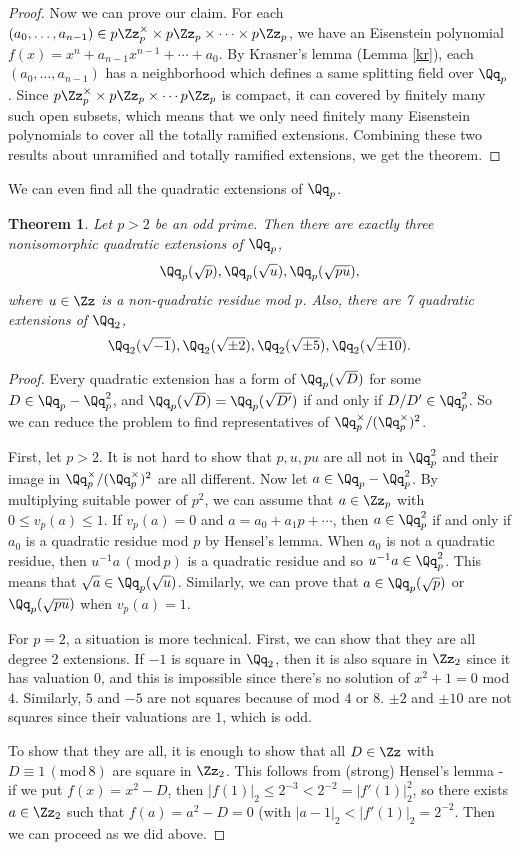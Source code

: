 \documentclass{article}
\newtheorem{theorem}{Theorem}
\newcommand{\Mod}[1]{\,(\mathrm{mod}\,#1)}
\begin{document}
\begin{proof}
Now we can prove our claim. For each $(a_{0}, \dots, a_{n-1}) \in p\Zz_{p}^{\times} \times p\Zz_{p} \times \cdots \times p\Zz_{p}$, we have an Eisenstein polynomial $f(x) = x^{n} + a_{n-1}x^{n-1} +  \cdots + a_{0}$. 
By Krasner's lemma (Lemma \ref{kr}), each $(a_{0}, \dots, a_{n-1})$ has a neighborhood which defines a same splitting field over $\Qq_{p}$. 
Since $p\Zz_{p}^{\times} \times  p\Zz_{p} \times \cdots p\Zz_{p}$ is compact, it can covered by finitely many such open subsets, which means that we only need finitely many Eisenstein polynomials to cover all the totally ramified extensions. Combining these two results about unramified and totally ramified extensions, we get the theorem. 
\end{proof}
We can even find all the quadratic extensions of $\Qq_{p}$. 
\begin{theorem}
Let $p>2$ be an odd prime. Then there are exactly three nonisomorphic quadratic extensions of $\Qq_{p}$, 
$$
\Qq_{p}(\sqrt{p}), \Qq_{p}(\sqrt{u}), \Qq_{p}(\sqrt{pu}), 
$$
where $u\in \Zz$ is a non-quadratic residue mod $p$. 
Also, there are 7 quadratic extensions of $\Qq_{2}$, 
$$
\Qq_{2}(\sqrt{-1}), \Qq_{2}(\sqrt{\pm 2}), \Qq_{2}(\sqrt{\pm 5}), \Qq_{2}(\sqrt{\pm 10}). 
$$
\end{theorem}
\begin{proof}
Every quadratic extension has a form of $\Qq_{p}(\sqrt{D})$ for some $D\in \Qq_{p} -\Qq_{p}^{2}$, and $\Qq_{p}(\sqrt{D}) = \Qq_{p}(\sqrt{D'})$ if and only if $D/D' \in \Qq_{p}^{2}$. 
So we can reduce the problem to find representatives of $\Qq_{p}^{\times}/ (\Qq_{p}^{\times})^{2}$. 

First, let $p>2$. It is not hard to show that $p, u, pu$ are all not in $\Qq_{p}^{2}$ and their image in $\Qq_{p}^{\times} / (\Qq_{p}^{\times})^{2}$ are all different. 
Now let $a\in \Qq_{p} -\Qq_{p}^{2}$. By multiplying suitable power of $p^{2}$, we can assume that $a\in \Zz_{p}$ with $0\leq v_{p}(a)\leq 1$. 
If $v_{p}(a) = 0$ and $a = a_{0} + a_{1}p + \cdots$, then $a\in \Qq_{p}^{2}$ if and only if $a_{0}$ is a quadratic residue mod $p$ by Hensel's lemma. When $a_{0}$ is not a quadratic residue, then $u^{-1}a\Mod{p}$ is a quadratic residue and so $u^{-1}a\in \Qq_{p}^{2}$. This means that $\sqrt{a}\in \Qq_{p}(\sqrt{u})$. 
Similarly, we can prove that $a \in \Qq_{p}(\sqrt{p})$ or $\Qq_{p}(\sqrt{pu})$ when $v_{p}(a) = 1$. 

For $p = 2$, a situation is more technical. 
First, we can show that they are all degree 2 extensions. If $-1$ is square in $\Qq_2$, then it is also square in $\Zz_2$ since it has valuation 0, and this is impossible since there's no solution of $x^{2} + 1 = 0$ mod $4$. Similarly, $5$ and $-5$ are not squares because of mod $4$ or $8$. $\pm2$ and $\pm 10$ are not squares since their valuations are $1$, which is odd. 

To show that they are all, it is enough to show that all $D\in \Zz$ with $D \equiv 1 \Mod{8}$ are square in $\Zz_{2}$. This follows from (strong) Hensel's lemma - if we put $f(x) = x^{2} - D$, then $|f(1)|_{2} \leq 2^{-3} < 2^{-2} = |f'(1)|_{2}^{2}$, so there exists $a\in \Zz_{2}$ such that $f(a) = a^{2} - D = 0$ (with $|a - 1|_{2} < |f'(1)|_{2} = 2^{-2}$. Then we can proceed as we did above. 
\end{proof}
\end{document}
